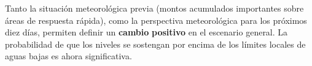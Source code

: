 Tanto la situación meteorológica previa (montos acumulados importantes
sobre áreas de respuesta rápida), como la perspectiva meteorológica para
los próximos diez días, permiten definir un {\textbf{cambio}}
{\textbf{positivo}} en el escenario general. La probabilidad de que los
niveles se sostengan por encima de los límites locales de aguas bajas es
ahora significativa.
